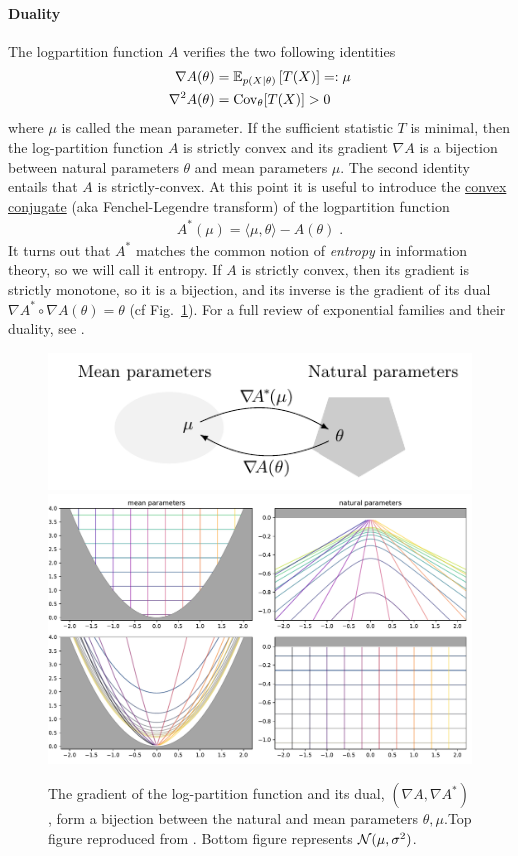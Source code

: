 \documentclass{article}
\newcommand*{\expect}[2][]{\ensuremath{\mathbb{E}_{#1} \left[ #2 \right] }} %
\newcommand{\logpart}{A}
\newcommand{\conj}{\logpart^*}
\newcommand{\nat}{\theta}
\newcommand{\meanp}{\mu}
\begin{document}
\paragraph{Duality}
The logpartition function $\logpart$ verifies the two following identities
\begin{align}
    \nabla\logpart(\nat) &=  \expect[p(X|\nat)]{T(X)} =: \meanp \\
    \nabla^2 \logpart(\nat) &= \Cov_\nat[T(X)] > 0
\end{align}
where $\meanp$ is called the mean parameter.
If the sufficient statistic $T$ is minimal, then the log-partition function $\logpart$ is strictly convex and its gradient $\nabla \logpart$ is a bijection between natural parameters $\nat$ and mean parameters $\mu$.
The second identity entails that $\logpart$ is strictly-convex. 
At this point it is useful to introduce the \href{https://en.wikipedia.org/wiki/Convex_conjugate}{convex conjugate} (aka Fenchel-Legendre transform) of the logpartition function
\begin{align}
	\conj(\mu) = \langle \mu, \nat \rangle - \logpart(\nat) \; .
\end{align}
It turns out that $\conj$ matches the common notion of \textit{entropy} in information theory, so we will call it entropy.
If $\logpart$ is strictly convex, then its gradient is strictly monotone, so it is a bijection, and its inverse is the gradient of its dual $\nabla\conj \circ \nabla\logpart(\nat) = \nat$ (cf Fig.~\ref{fig:duality}).
For a full review of exponential families and their duality, see \citet[Chapter 3]{wainwright2008graphical}.
\begin{figure}[ht]
	\centering
	\includegraphics[width= .6\textwidth]{figs/duality} \\
	\includegraphics[width=.7\textwidth]{figs/2d/mirrormap.pdf}
	\caption{The gradient of the log-partition function and its dual, $(\nabla \logpart, \nabla \conj)$, form a bijection between the natural and mean parameters $\nat, \meanp$.Top figure reproduced from \citet{kunstner2020homeomorphic}. Bottom figure represents ${\mathcal N}(\mu, \sigma^2)$.}
	\label{fig:duality}
\end{figure}
\end{document}
